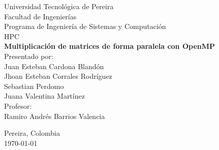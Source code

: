 \begin{titlepage}
    \centering
    \vspace*{0.5cm}
    
    {\Large Universidad Tecnológica de Pereira}\\[0.5cm]
    {\large Facultad de Ingenierías}\\[0.3cm]
    {\large Programa de Ingeniería de Sistemas y Computación}\\[0.3cm]
    {\large HPC}\\[3cm]
    
    {\LARGE\textbf{Multiplicación de matrices de forma paralela con OpenMP}}\\[2cm]
        
    {\large Presentado por:}\\[0.3cm]
    {\large Juan Esteban Cardona Blandón}\\[0.3cm]
    {\large Jhoan Esteban Corrales Rodríguez}\\[0.3cm]
    {\large Sebastian Perdomo}\\[0.3cm]
    {\large Juana Valentina Martínez}\\[1cm]
    {\large Profesor:}\\[0.3cm]
    {\large Ramiro Andrés Barrios Valencia}\\[0.3cm]
        
    \vfill
    
    {\large Pereira, Colombia}\\[0.3cm]
    {\large \today}
    
\end{titlepage}
